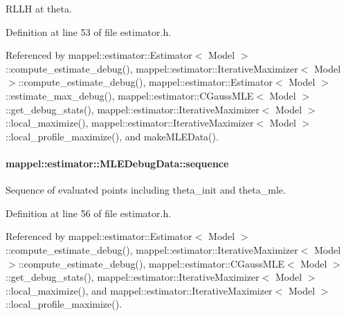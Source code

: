 R\+L\+LH at theta. 



Definition at line 53 of file estimator.\+h.



Referenced by mappel\+::estimator\+::\+Estimator$<$ Model $>$\+::compute\+\_\+estimate\+\_\+debug(), mappel\+::estimator\+::\+Iterative\+Maximizer$<$ Model $>$\+::compute\+\_\+estimate\+\_\+debug(), mappel\+::estimator\+::\+Estimator$<$ Model $>$\+::estimate\+\_\+max\+\_\+debug(), mappel\+::estimator\+::\+C\+Gauss\+M\+L\+E$<$ Model $>$\+::get\+\_\+debug\+\_\+stats(), mappel\+::estimator\+::\+Iterative\+Maximizer$<$ Model $>$\+::local\+\_\+maximize(), mappel\+::estimator\+::\+Iterative\+Maximizer$<$ Model $>$\+::local\+\_\+profile\+\_\+maximize(), and make\+M\+L\+E\+Data().

\paragraph[{\texorpdfstring{sequence}{sequence}}]{ mappel\+::estimator\+::\+M\+L\+E\+Debug\+Data\+::sequence}\hypertarget{structmappel_1_1estimator_1_1MLEDebugData_a4419c4ee9559999be39df4a7469a47fa}{}\label{structmappel_1_1estimator_1_1MLEDebugData_a4419c4ee9559999be39df4a7469a47fa}


Sequence of evaluated points including theta\+\_\+init and theta\+\_\+mle. 



Definition at line 56 of file estimator.\+h.



Referenced by mappel\+::estimator\+::\+Estimator$<$ Model $>$\+::compute\+\_\+estimate\+\_\+debug(), mappel\+::estimator\+::\+Iterative\+Maximizer$<$ Model $>$\+::compute\+\_\+estimate\+\_\+debug(), mappel\+::estimator\+::\+C\+Gauss\+M\+L\+E$<$ Model $>$\+::get\+\_\+debug\+\_\+stats(), mappel\+::estimator\+::\+Iterative\+Maximizer$<$ Model $>$\+::local\+\_\+maximize(), and mappel\+::estimator\+::\+Iterative\+Maximizer$<$ Model $>$\+::local\+\_\+profile\+\_\+maximize().

